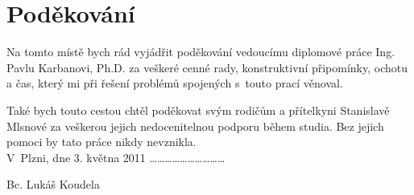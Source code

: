 \section*{Poděkování}
Na tomto místě bych rád vyjádřit poděkování vedoucímu diplomové práce Ing. Pavlu Karbanovi, Ph.D. za veškeré cenné rady, konstruktivní připomínky, ochotu a čas, který mi při řešení problémů spojených s~touto prací věnoval.

Také bych touto cestou chtěl poděkovat svým rodičům a přítelkyni Stanislavě Mlsnové za veškerou jejich nedocenitelnou podporu během studia. Bez jejich pomoci by tato práce nikdy nevznikla.\bigskip \bigskip \\

\noindent V~Plzni, dne 3. května 2011 \hfill \ldots \ldots \ldots \ldots \ldots \ldots \ldots \ldots \ldots \ldots
\noindent \begin{flushright}Bc. Lukáš Koudela ~~~~~~~\end{flushright}
\newpage
